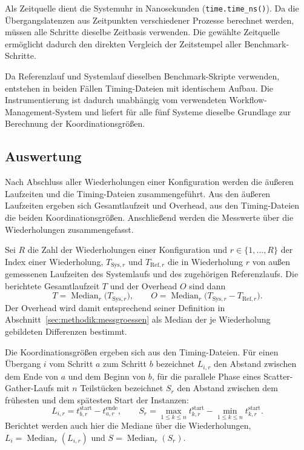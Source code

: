 Als Zeitquelle dient die Systemuhr in Nanosekunden
(\texttt{time.time\_ns()}). Da die Übergangslatenzen aus
Zeitpunkten verschiedener Prozesse berechnet werden, müssen alle
Schritte dieselbe Zeitbasis verwenden. Die gewählte Zeitquelle
ermöglicht dadurch den direkten Vergleich der Zeitstempel aller
Benchmark-Schritte.

\begin{sloppypar}
Da Referenzlauf und Systemlauf dieselben Benchmark-Skripte
verwenden, entstehen in beiden Fällen Timing-Dateien mit
identischem Aufbau. Die Instrumentierung ist dadurch unabhängig
vom verwendeten Workflow-Management-System und liefert für alle
fünf Systeme dieselbe Grundlage zur Berechnung der
Koordinationsgrößen.
\end{sloppypar}

\subsection{Auswertung}
\label{sec:methodik:auswertung}

Nach Abschluss aller Wiederholungen einer Konfiguration werden die
äußeren Laufzeiten und die Timing-Dateien zusammengeführt. Aus den
äußeren Laufzeiten ergeben sich Gesamtlaufzeit und Overhead, aus
den Timing-Dateien die beiden Koordinationsgrößen. Anschließend
werden die Messwerte über die Wiederholungen zusammengefasst.

Sei $R$ die Zahl der Wiederholungen einer Konfiguration und
$r \in \{1,\ldots,R\}$ der Index einer Wiederholung,
$T_{\mathrm{Sys},r}$ und $T_{\mathrm{Ref},r}$ die in Wiederholung
$r$ von außen gemessenen Laufzeiten des Systemlaufs und des
zugehörigen Referenzlaufs. Die berichtete Gesamtlaufzeit $T$ und
der Overhead $O$ sind dann
\[
  T = \operatorname{Median}_{r}\bigl(T_{\mathrm{Sys},r}\bigr),
  \qquad
  O = \operatorname{Median}_{r}\bigl(T_{\mathrm{Sys},r}
      - T_{\mathrm{Ref},r}\bigr).
\]
Der Overhead wird damit entsprechend seiner Definition in
Abschnitt~\ref{sec:methodik:messgroessen} als Median der je
Wiederholung gebildeten Differenzen bestimmt.

Die Koordinationsgrößen ergeben sich aus den Timing-Dateien. Für
einen Übergang $i$ vom Schritt $a$ zum Schritt $b$ bezeichnet
$L_{i,r}$ den Abstand zwischen dem Ende von $a$ und dem Beginn von
$b$, für die parallele Phase eines Scatter-Gather-Laufs mit $n$
Teilstücken bezeichnet $S_r$ den Abstand zwischen dem frühesten und
dem spätesten Start der Instanzen:
\[
  L_{i,r} = t^{\text{start}}_{b,r} - t^{\text{ende}}_{a,r},
  \qquad
  S_r = \max_{1 \le k \le n} t^{\text{start}}_{k,r}
      - \min_{1 \le k \le n} t^{\text{start}}_{k,r}.
\]
Berichtet werden auch hier die Mediane über die Wiederholungen,
$L_i = \operatorname{Median}_{r}(L_{i,r})$ und
$S = \operatorname{Median}_{r}(S_r)$.

